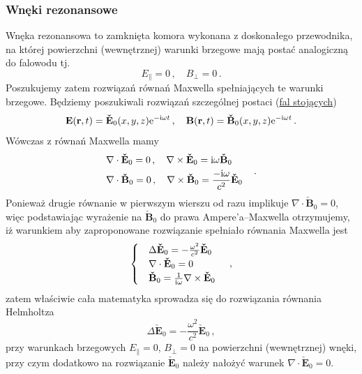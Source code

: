 \documentclass[../main.tex]{subfiles}
\begin{document}
\subsubsection{Wnęki rezonansowe}
Wnęka rezonansowa to zamknięta komora wykonana z doskonałego przewodnika, na której powierzchni (wewnętrznej) warunki brzegowe mają postać analogiczną do falowodu tj.
\begin{equation*}
    E_\parallel=0\,,\quad B_\perp=0\,.
\end{equation*}
Poszukujemy zatem rozwiązań równań Maxwella spełniających te warunki brzegowe. Będziemy poszukiwali rozwiązań szczególnej postaci (\underline{fal stojących})
\begin{equation*}
    \mathbf{E}(\mathbf{r},t)=\mathbf{\check E}_0(x,y,z)\mathrm{e}^{-\mathrm{i}\omega t}\,,\quad \mathbf{B}(\mathbf{r},t)=\mathbf{\check B}_0(x,y,z)\mathrm{e}^{-\mathrm{i}\omega t}\,.
\end{equation*}
Wówczas z równań Maxwella mamy
\begin{equation*}
    \begin{split}
        &\nabla\cdot\mathbf{\check E}_0=0\,,\quad \nabla\times\mathbf{\check E}_0=\mathrm{i}\omega\mathbf{\check B}_0\\
        &\nabla\cdot\mathbf{\check B}_0=0\,,\quad \nabla\times\mathbf{\check B}_0=\frac{-\mathrm{i}\omega}{c^2}\mathbf{\check E}_0
    \end{split}\quad\,.
\end{equation*}
Ponieważ drugie równanie w pierwszym wierszu od razu implikuje \(\nabla\cdot\mathbf{\check B}_0=0\), więc podstawiając wyrażenie na \(\mathbf{\check B}_0\) do prawa Ampere'a--Maxwella otrzymujemy, iż warunkiem aby zaproponowane rozwiązanie spełniało równania Maxwella jest
\begin{equation*}
    \begin{cases}
        &\Delta\mathbf{\check E}_0=-\frac{\omega^2}{c^2}\mathbf{\check{E}}_0\\
        &\nabla\cdot\mathbf{\check E}_0=0\\
        &\mathbf{\check B}_0=\frac{1}{\mathrm{i}\omega}\nabla\times\mathbf{\check E}_0
    \end{cases}\quad\,,
\end{equation*}
zatem właściwie cała matematyka sprowadza się do rozwiązania równania Helmholtza
\begin{equation*}
    \Delta\mathbf{\check E}_0=-\frac{\omega^2}{c^2}\mathbf{\check{E}}_0\,,
\end{equation*}
przy warunkach brzegowych \(E_\parallel=0\), \(B_\perp=0\) na powierzchni (wewnętrznej) wnęki, przy czym dodatkowo na rozwiązanie \(\mathbf{\check E}_0\) należy nałożyć warunek \(\nabla\cdot\mathbf{\check E}_0=0\). 
\end{document}
